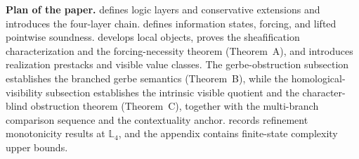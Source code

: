 \medskip
\noindent\textbf{Plan of the paper.}
 defines logic layers and conservative extensions and introduces the four-layer chain.  defines information states, forcing, and lifted pointwise soundness.  develops local objects, proves the sheafification characterization and the forcing-necessity theorem (Theorem~A), and introduces realization prestacks and visible value classes. The gerbe-obstruction subsection establishes the branched gerbe semantics (Theorem~B), while the homological-visibility subsection establishes the intrinsic visible quotient and the character-blind obstruction theorem (Theorem~C), together with the multi-branch comparison sequence and the contextuality anchor.  records refinement monotonicity results at $\mathbb{L}_4$, and the appendix contains finite-state complexity upper bounds.
